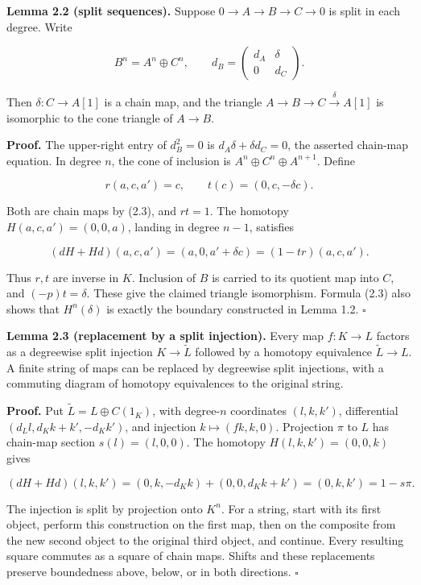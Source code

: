 \documentclass[
  english,
  11pt,
  a4paper,
]{article}
\begin{document}
\textbf{Lemma 2.2 (split sequences).} Suppose \(0\to A\to B\to C\to0\)
is split in each degree. Write

\[B^n=A^n\oplus C^n,\qquad
d_B=\begin{pmatrix}d_A&\delta\\0&d_C\end{pmatrix}.
\tag{2.3}\]

Then \(\delta:C\to A[1]\) is a chain map, and the triangle
\(A\to B\to C\xrightarrow\delta A[1]\) is isomorphic to the cone
triangle of \(A\to B\).

\textbf{Proof.} The upper-right entry of \(d_B^2=0\) is
\(d_A\delta+\delta d_C=0\), the asserted chain-map equation. In degree
\(n\), the cone of inclusion is \(A^n\oplus C^n\oplus A^{n+1}\). Define

\[r(a,c,a')=c,\qquad t(c)=(0,c,-\delta c).\]

Both are chain maps by (2.3), and \(rt=1\). The homotopy
\(H(a,c,a')=(0,0,a)\), landing in degree \(n-1\), satisfies

\[(dH+Hd)(a,c,a')=(a,0,a'+\delta c)=(1-tr)(a,c,a').\]

Thus \(r,t\) are inverse in \(K\). Inclusion of \(B\) is carried to its
quotient map into \(C\), and \((-p)t=\delta\). These give the claimed
triangle isomorphism. Formula (2.3) also shows that \(H^n(\delta)\) is
exactly the boundary constructed in Lemma 1.2. \(\square\)

\textbf{Lemma 2.3 (replacement by a split injection).} Every map
\(f:K\to L\) factors as a degreewise split injection
\(K\to\widetilde L\) followed by a homotopy equivalence
\(\widetilde L\to L\). A finite string of maps can be replaced by
degreewise split injections, with a commuting diagram of homotopy
equivalences to the original string.

\textbf{Proof.} Put \(\widetilde L=L\oplus C(1_K)\), with degree-\(n\)
coordinates \((l,k,k')\), differential \((d_Ll,d_Kk+k',-d_Kk')\), and
injection \(k\mapsto(fk,k,0)\). Projection \(\pi\) to \(L\) has
chain-map section \(s(l)=(l,0,0)\). The homotopy \(H(l,k,k')=(0,0,k)\)
gives

\[(dH+Hd)(l,k,k')=(0,k,-d_Kk)+(0,0,d_Kk+k')=(0,k,k')=1-s\pi.\]

The injection is split by projection onto \(K^n\). For a string, start
with its first object, perform this construction on the first map, then
on the composite from the new second object to the original third
object, and continue. Every resulting square commutes as a square of
chain maps. Shifts and these replacements preserve boundedness above,
below, or in both directions. \(\square\)
\end{document}
